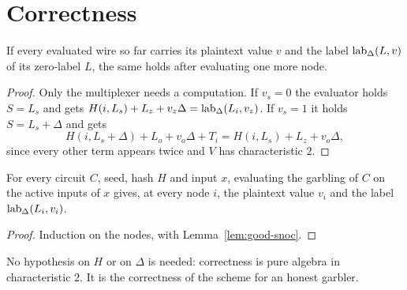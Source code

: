\section{Correctness}

\begin{lemma}
  \label{lem:good-snoc}
  \leanok
  If every evaluated wire so far carries its plaintext value $v$ and the label
  $\operatorname{lab}_\Delta(L, v)$ of its zero-label $L$, the same holds after evaluating one more node.
\end{lemma}

\begin{proof}
  \leanok
  Only the multiplexer needs a computation. If $v_s = 0$ the evaluator holds $S = L_s$ and gets
  $H(i, L_s) + L_z + v_z \Delta = \operatorname{lab}_\Delta(L_i, v_z)$. If $v_s = 1$ it holds
  $S = L_s + \Delta$ and gets
  \[ H(i, L_s + \Delta) + L_o + v_o\Delta + T_i = H(i, L_s) + L_z + v_o \Delta , \]
  since every other term appears twice and $V$ has characteristic $2$.
\end{proof}

\begin{theorem}[Correctness]
  \label{thm:eval-garble}
  \leanok
  For every circuit $C$, seed, hash $H$ and input $x$, evaluating the garbling of $C$ on the active
  inputs of $x$ gives, at every node $i$, the plaintext value $v_i$ and the label
  $\operatorname{lab}_\Delta(L_i, v_i)$.
\end{theorem}

\begin{proof}
  \leanok
  Induction on the nodes, with Lemma~\ref{lem:good-snoc}.
\end{proof}

\begin{remark}
  No hypothesis on $H$ or on $\Delta$ is needed: correctness is pure algebra in characteristic
  $2$. It is the correctness of the scheme for an honest garbler.
\end{remark}
